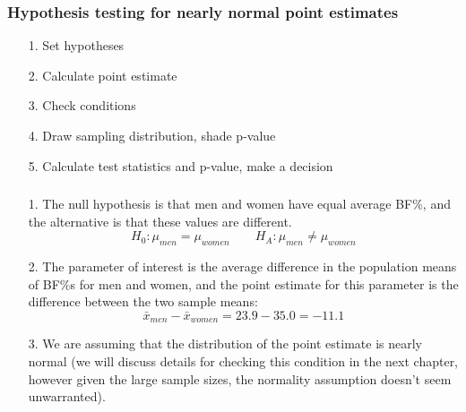 \begin{frame}
\frametitle{Hypothesis testing for nearly normal point estimates}


\pause

\begin{enumerate}
\item[1.] Set hypotheses
\item[2.] Calculate point estimate
\item[3.] Check conditions
\item[4.] Draw sampling distribution, shade p-value
\item[5.] Calculate test statistics and p-value, make a decision
\end{enumerate}

\end{frame}


\begin{frame}
\frametitle{}

\begin{enumerate}

\item[1.] The null hypothesis is that men and women have equal average BF\%, and the alternative is that these values are different.
\[ H_0: \mu_{men} = \mu_{women} \qquad H_A: \mu_{men} \ne \mu_{women} \]

\pause

\item [2.]The parameter of interest is the average difference in the population means of BF\%s for men and women, and the point estimate for this parameter is the difference between the two sample means:
\[ \bar{x}_{men} - \bar{x}_{women} = 23.9 - 35.0 = -11.1 \]

\pause

\item[3.] We are assuming that the distribution of the point estimate is nearly normal (we will discuss details for checking this condition in the next chapter, however given the large sample sizes, the normality assumption doesn't seem unwarranted).

\end{enumerate}


\end{frame}

